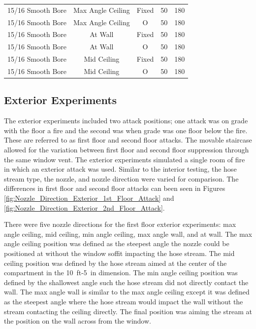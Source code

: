\documentclass[12pt,oneside]{book}
\begin{document}
\begin{table}[!ht]
\begin{tabular}{ccccc}
15/16 Smooth Bore & Max Angle Ceiling   & Fixed   & 50 & 180 \\
15/16 Smooth Bore & Max Angle Ceiling   & O & 50  & 180 \\
15/16 Smooth Bore & At Wall     		& Fixed   & 50 & 180 \\
15/16 Smooth Bore & At Wall     		& O & 50  & 180 \\
15/16 Smooth Bore & Mid Ceiling 		& Fixed   & 50 & 180 \\
15/16 Smooth Bore & Mid Ceiling 		& O & 50  & 180 \\
\bottomrule[1.25pt]
\end{tabular}
\end{table}

\clearpage

\subsection{Exterior Experiments}
\label{ext_tests}

The exterior experiments included two attack positions; one attack was on grade with the floor a fire and the second was when grade was one floor below the fire. These are referred to as first floor and second floor attacks. The movable staircase allowed for the variation between first floor and second floor suppression through the same window vent. The exterior experiments simulated a single room of fire in which an exterior attack was used. Similar to the interior testing, the hose stream type, the nozzle, and nozzle direction were varied for comparison. The differences in first floor and second floor attacks can been seen in Figures \ref{fig:Nozzle_Direction_Exterior_1st_Floor_Attack} and \ref{fig:Nozzle_Direction_Exterior_2nd_Floor_Attack}. 

There were five nozzle directions for the first floor exterior experiments: max angle ceiling, mid ceiling, min angle ceiling, max angle wall, and at wall. The max angle ceiling position was defined as the steepest angle the nozzle could be positioned at without the window soffit impacting the hose stream. The mid ceiling position was defined by the hose stream aimed at the center of the compartment in the 10~ft-5~in dimension. The min angle ceiling position was defined by the shallowest angle such the hose stream did not directly contact the wall. The max angle wall is similar to the max angle ceiling except it was defined as the steepest angle where the hose stream would impact the wall without the stream contacting the ceiling directly. The final position was aiming the stream at the position on the wall across from the window.
\end{document}

